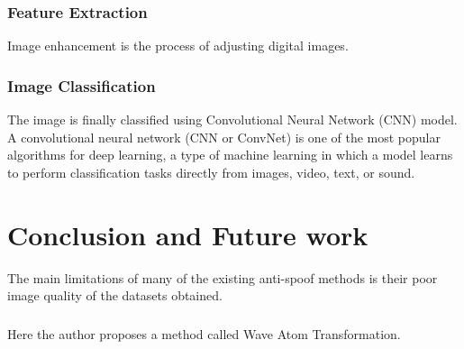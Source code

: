 \subsection{Feature Extraction}
Image enhancement is the process of adjusting digital images.
\subsection{Image Classification}
The image is finally classified using Convolutional Neural Network (CNN) model. A convolutional neural network (CNN or ConvNet) is one of the most popular algorithms for deep learning, a type of machine learning in which a model learns to perform classification tasks directly from images, video, text, or sound.

\chapter{Conclusion and Future work}

The main limitations of many of the existing anti-spoof methods is their poor image quality of the datasets obtained. 
\paragraph{}Here the author proposes a method called Wave Atom Transformation.

